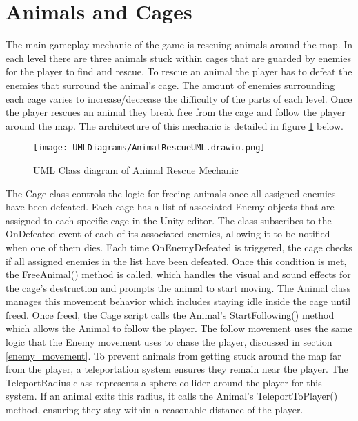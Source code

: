 \documentclass[10pt]{final_report}
\begin{document}
\section{Animals and Cages}
The main gameplay mechanic of the game is rescuing animals around the map. In each level there are three animals stuck within cages that are guarded by enemies for the player to find and rescue. To rescue an animal the player has to defeat the enemies that surround the animal's cage. The amount of enemies surrounding each cage varies to increase/decrease the difficulty of the parts of each level. Once the player rescues an animal they break free from the cage and follow the player around the map. The architecture of this mechanic is detailed in figure \ref{fig:label_rescue} below. 
\begin{figure}[H]
    \centering
    \texttt{[image: UMLDiagrams/AnimalRescueUML.drawio.png]}
    \caption{UML Class diagram of Animal Rescue Mechanic}
    \label{fig:label_rescue}
\end{figure}
The Cage class controls the logic for freeing animals once all assigned enemies have been defeated. Each cage has a list of associated Enemy objects that are assigned to each specific cage in the Unity editor. The class subscribes to the OnDefeated event of each of its associated enemies, allowing it to be notified when one of them dies. Each time OnEnemyDefeated is triggered, the cage checks if all assigned enemies in the list have been defeated. Once this condition is met, the FreeAnimal() method is called, which handles the visual and sound effects for the cage's destruction and prompts the animal to start moving. The Animal class manages this movement behavior which includes staying idle inside the cage until freed. Once freed, the Cage script calls the Animal's StartFollowing() method which allows the Animal to follow the player. The follow movement uses the same logic that the Enemy movement uses to chase the player, discussed in section \ref{enemy_movement}. To prevent animals from getting stuck around the map far from the player, a teleportation system ensures they remain near the player. The TeleportRadius class represents a sphere collider around the player for this system. If an animal exits this radius, it calls the Animal's TeleportToPlayer() method, ensuring they stay within a reasonable distance of the player.

\end{document}
